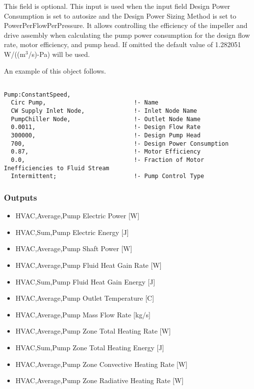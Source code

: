 This field is optional. This input is used when the input field Design Power Consumption is set to autosize and the Design Power Sizing Method is set to PowerPerFlowPerPressure. It allows controlling the efficiency of the impeller and drive assembly when calculating the pump power consumption for the design flow rate, motor efficiency, and pump head. If omitted the default value of 1.282051 W/((m\(^{3}\)/s)-Pa) will be used.

An example of this object follows.

\begin{lstlisting}

Pump:ConstantSpeed,
  Circ Pump,                         !- Name
  CW Supply Inlet Node,              !- Inlet Node Name
  PumpChiller Node,                  !- Outlet Node Name
  0.0011,                            !- Design Flow Rate
  300000,                            !- Design Pump Head
  700,                               !- Design Power Consumption
  0.87,                              !- Motor Efficiency
  0.0,                               !- Fraction of Motor Inefficiencies to Fluid Stream
  Intermittent;                      !- Pump Control Type
\end{lstlisting}

\subsubsection{Outputs}\label{outputs-1-020}

\begin{itemize}
\item
  HVAC,Average,Pump Electric Power {[}W{]}
\item
  HVAC,Sum,Pump Electric Energy {[}J{]}
\item
  HVAC,Average,Pump Shaft Power {[}W{]}
\item
  HVAC,Average,Pump Fluid Heat Gain Rate {[}W{]}
\item
  HVAC,Sum,Pump Fluid Heat Gain Energy {[}J{]}
\item
  HVAC,Average,Pump Outlet Temperature {[}C{]}
\item
  HVAC,Average,Pump Mass Flow Rate {[}kg/s{]}
\item
  HVAC,Average,Pump Zone Total Heating Rate {[}W{]}
\item
  HVAC,Sum,Pump Zone Total Heating Energy {[}J{]}
\item
  HVAC,Average,Pump Zone Convective Heating Rate {[}W{]}
\item
  HVAC,Average,Pump Zone Radiative Heating Rate {[}W{]}
\end{itemize}

